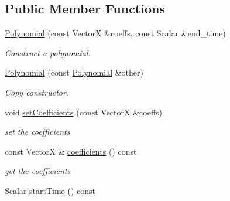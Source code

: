 \subsection*{Public Member Functions}
\begin{DoxyCompactItemize}
\item 
\hyperlink{classow__core_1_1Polynomial_a6ac9153fc66fc9fa29a283a2fb3f21b1}{Polynomial} (const VectorX \&coeffs, const Scalar \&end\+\_\+time)\hypertarget{classow__core_1_1Polynomial_a6ac9153fc66fc9fa29a283a2fb3f21b1}{}\label{classow__core_1_1Polynomial_a6ac9153fc66fc9fa29a283a2fb3f21b1}

\begin{DoxyCompactList}\small\item\em Construct a polynomial. \end{DoxyCompactList}\item 
\hyperlink{classow__core_1_1Polynomial_aed4760cd610fb659071db05214b59fdd}{Polynomial} (const \hyperlink{classow__core_1_1Polynomial}{Polynomial} \&other)\hypertarget{classow__core_1_1Polynomial_aed4760cd610fb659071db05214b59fdd}{}\label{classow__core_1_1Polynomial_aed4760cd610fb659071db05214b59fdd}

\begin{DoxyCompactList}\small\item\em Copy constructor. \end{DoxyCompactList}\item 
void \hyperlink{classow__core_1_1Polynomial_a93ee2da1880827b41ab4faf083a2bb31}{set\+Coefficients} (const VectorX \&coeffs)\hypertarget{classow__core_1_1Polynomial_a93ee2da1880827b41ab4faf083a2bb31}{}\label{classow__core_1_1Polynomial_a93ee2da1880827b41ab4faf083a2bb31}

\begin{DoxyCompactList}\small\item\em set the coefficients \end{DoxyCompactList}\item 
const VectorX \& \hyperlink{classow__core_1_1Polynomial_a9629fab60c27ca47f5f17595933c4f1d}{coefficients} () const \hypertarget{classow__core_1_1Polynomial_a9629fab60c27ca47f5f17595933c4f1d}{}\label{classow__core_1_1Polynomial_a9629fab60c27ca47f5f17595933c4f1d}

\begin{DoxyCompactList}\small\item\em get the coefficients \end{DoxyCompactList}\item 
Scalar \hyperlink{classow__core_1_1Polynomial_aa9e7d5a99391b313d9a4b0c6bfb994bb}{start\+Time} () const \hypertarget{classow__core_1_1Polynomial_aa9e7d5a99391b313d9a4b0c6bfb994bb}{}\label{classow__core_1_1Polynomial_aa9e7d5a99391b313d9a4b0c6bfb994bb}


\end{DoxyCompactItemize}
